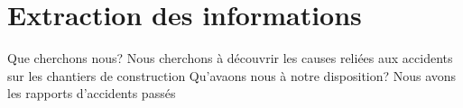 \section{Extraction des informations}

	\begin{frame}
		Que cherchons nous?
		Nous cherchons à découvrir les causes reliées aux accidents sur les chantiers de construction
		Qu'avaons nous à notre disposition?
		Nous avons les rapports d'accidents passés
		
	
	
		
\end{frame}